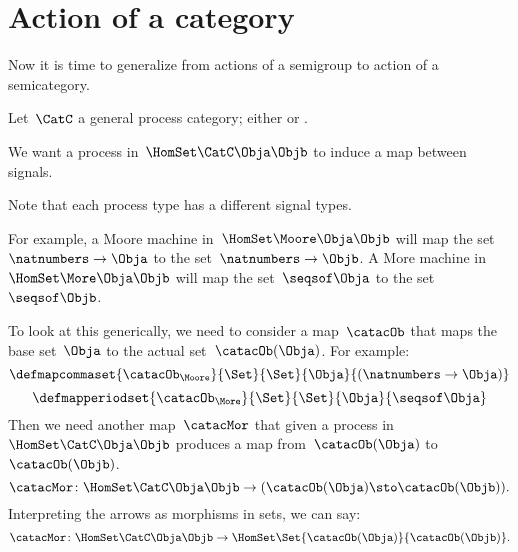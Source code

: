 
\section{Action of a category}



Now it is time to generalize from actions of a semigroup to action of a semicategory.

Let~$\CatC$ a general process category; either \Moore or \More.

We want a process in~$\HomSet\CatC\Obja\Objb$ to induce a map between signals.

Note that each process type has a different signal types.

For example, a Moore machine in~$\HomSet\Moore\Obja\Objb$ will map the set~$\natnumbers \to \Obja$ to the set~$\natnumbers \to \Objb$.
A More machine in~$\HomSet\More\Obja\Objb$  will map the set~$\seqsof \Obja$ to the set~$\seqsof \Objb$.

To look at this generically, we need to consider a map~$\catacOb$ that maps the base set~$\Obja$ to the actual set~$\catacOb(\Obja)$.
For example:
%
\begin{equation}
    \defmapcommaset{
        \catacOb_{\Moore}
    }{
        \Set
    }{
        \Set
    }{
        \Obja
    }{
        (\natnumbers \to \Obja)
    }
\end{equation}
%
\begin{equation}
    \defmapperiodset{
        \catacOb_{\More}
    }{
        \Set
    }{
        \Set
    }{
        \Obja
    }{
        \seqsof \Obja
    }
\end{equation}
%
Then we need another map~$\catacMor$ that given a process in~$\HomSet\CatC\Obja\Objb$ produces a map from~$\catacOb(\Obja)$ to~$\catacOb(\Objb)$.
%
\begin{equation}
    \label{eq:gamma-1}
    \catacMor\colon \HomSet\CatC\Obja\Objb \to  (\catacOb(\Obja) \sto \catacOb(\Objb)).
\end{equation}
%
Interpreting the arrows as morphisms in sets, we can say:
%
\begin{equation}
    \label{eq:gamma-2}
    \catacMor\colon \HomSet\CatC\Obja\Objb \to  \HomSet\Set{\catacOb(\Obja)}{\catacOb(\Objb) }.
\end{equation}
%

